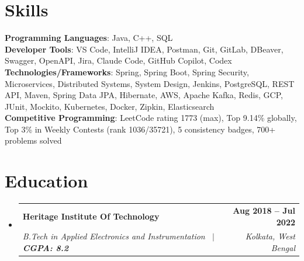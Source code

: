 \documentclass[letterpaper,11pt]{article}
\makeatletter
\newcommand{\resumeSubheading}[4]{
  \vspace{-2pt}\item
    \begin{tabular*}{1.0\textwidth}[t]{l@{\extracolsep{\fill}}r}
      \textbf{#1} & \textbf{\small #2} \\
      \textit{\small#3} & \textit{\small #4} \\
    \end{tabular*}\vspace{-7pt}
}
\newcommand{\resumeSubHeadingListStart}{\begin{itemize}[leftmargin=0.0in, label={}]}
\newcommand{\resumeSubHeadingListEnd}{\end{itemize}}
\makeatother
\begin{document}
\section{Skills}
  \begin{itemize}[leftmargin=0.15in, label={}]
    \small{\item{
      \textbf{Programming Languages}{: Java, C++, SQL} \\
      \textbf{Developer Tools}{: VS Code, IntelliJ IDEA, Postman, Git, GitLab, DBeaver, Swagger, OpenAPI, Jira, Claude Code, GitHub Copilot, Codex} \\
      \textbf{Technologies/Frameworks}{: Spring, Spring Boot, Spring Security, Microservices, Distributed Systems, System Design, Jenkins, PostgreSQL, REST API, Maven, Spring Data JPA, Hibernate, AWS, Apache Kafka, Redis, GCP, JUnit, Mockito, Kubernetes, Docker, Zipkin, Elasticsearch} \\
      \textbf{Competitive Programming}{: LeetCode rating 1773 (max), Top 9.14\% globally, Top 3\% in Weekly Contests (rank 1036/35721), 5 consistency badges, 700+ problems solved}
    }}
  \end{itemize}
\vspace{-10pt}


\section{Education}
  \resumeSubHeadingListStart
    \resumeSubheading
      {Heritage Institute Of Technology}{Aug 2018 -- Jul 2022}
      {B.Tech in Applied Electronics and Instrumentation ~$|$ \textbf{CGPA: 8.2}}{Kolkata, West Bengal}
  \resumeSubHeadingListEnd
\end{document}
